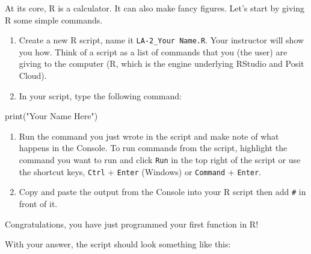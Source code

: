 \documentclass[
]{article}
\newenvironment{Shaded}{\begin{snugshade}}{\end{snugshade}}
\newcommand{\FunctionTok}[1]{\textcolor[rgb]{0.28,0.35,0.67}{#1}}
\newcommand{\NormalTok}[1]{\textcolor[rgb]{0.00,0.23,0.31}{#1}}
\newcommand{\StringTok}[1]{\textcolor[rgb]{0.13,0.47,0.30}{#1}}
\begin{document}
At its core, R is a calculator. It can also make fancy figures. Let's
start by giving R some simple commands.

\begin{enumerate}
\def\labelenumi{\arabic{enumi})}
\item
  Create a new R script, name it \texttt{LA-2\_Your\ Name.R}. Your
  instructor will show you how. Think of a script as a list of commands
  that you (the user) are giving to the computer (R, which is the engine
  underlying RStudio and Posit Cloud).
\item
  In your script, type the following command:
\end{enumerate}

\begin{Shaded}
\begin{Highlighting}[]
\FunctionTok{print}\NormalTok{(}\StringTok{"Your Name Here"}\NormalTok{)}
\end{Highlighting}
\end{Shaded}

\begin{enumerate}
\def\labelenumi{\arabic{enumi})}
\setcounter{enumi}{2}
\item
  Run the command you just wrote in the script and make note of what
  happens in the Console. To run commands from the script, highlight the
  command you want to run and click \texttt{Run} in the top right of the
  script or use the shortcut keys, \texttt{Ctrl} + \texttt{Enter}
  (Windows) or \texttt{Command} + \texttt{Enter}.
\item
  Copy and paste the output from the Console into your R script then add
  \texttt{\#} in front of it.
\end{enumerate}

\begin{tcolorbox}[enhanced jigsaw, arc=.35mm, bottomrule=.15mm, bottomtitle=1mm, breakable, colback=white, colbacktitle=quarto-callout-note-color!10!white, colframe=quarto-callout-note-color-frame, coltitle=black, left=2mm, leftrule=.75mm, opacityback=0, opacitybacktitle=0.6, rightrule=.15mm, title=\textcolor{quarto-callout-note-color}{\faInfo}\hspace{0.5em}{Note}, titlerule=0mm, toprule=.15mm, toptitle=1mm]

Congratulations, you have just programmed your first function in R!

\end{tcolorbox}

With your answer, the script should look something like this:
\end{document}
